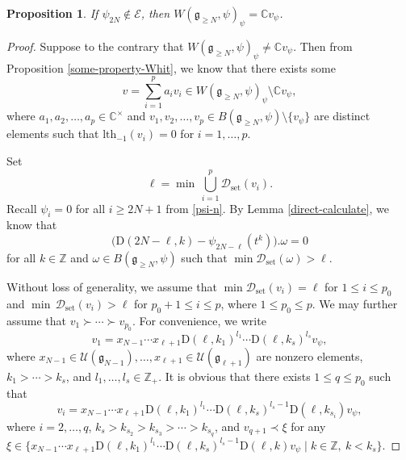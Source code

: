 \documentclass[12pt, a4paper]{amsart}
\newcommand{\fg}{\mathfrak g}
\newcommand{\C}{\mathbb{C}}
\newcommand{\Z}{\mathbb Z}
\newcommand{\rD}{\mathrm{D}}
\newcommand{\U}{\mathcal{U}}
\theoremstyle{Theorem}
\theoremstyle{Theorem}
\newtheorem{proposition}[thm]{Proposition}
\numberwithin{equation}{section}
\begin{document}
\begin{proposition}\label{EXP-2N}
If $\psi_{2N}\notin\mathcal{E}$, then $W(\fg_{\geq N},\psi)_{\psi}=\C v_{\psi}$.
\end{proposition}
\begin{proof}
Suppose to the contrary that $W(\fg_{\geq N},\psi)_{\psi}\neq\C v_{\psi}$.
Then from Proposition \ref{some-property-Whit}, we know that
there exists some \[v=\sum_{i=1}^{p}a_{i}v_{i}\in W(\fg_{\geq N},\psi)_{\psi}\setminus \C v_{\psi},\]
where $a_{1},a_{2},\dots,a_{p}\in\C^{\times}$ and
$v_{1},v_{2},\dots,v_{p}\in B(\fg_{\geq N},\psi)\setminus\{v_{\psi}\}$ are distinct elements
such that $\mathrm{lth}_{-1}(v_{i})=0$ for $i=1,\dots,p$.

Set \[\ell=\min\,\bigcup_{i=1}^{p}\mathcal{D}_{\mathrm{set}}(v_{i}).\]
Recall $\psi_{i}=0$ for all $i\geq2N+1$ from \eqref{psi-n}. By Lemma \ref{direct-calculate}, we know that
\[\big(\rD(2N-\ell,k)-\psi_{2N-\ell}(t^{k})\big).\omega=0\]
for all $k\in\Z$ and $\omega\in B(\fg_{\geq N},\psi)$ such that $\min\mathcal{D}_{\mathrm{set}}(\omega)>\ell$.

Without loss of generality, we assume that $\min\mathcal{D}_{\mathrm{set}}(v_{i})=\ell$
for $1\leq i\leq p_{0}$ and $\min\,\mathcal{D}_{\mathrm{set}}(v_{i})>\ell$ for $p_{0}+1\leq i\leq p$,
where $1\leq p_{0}\leq p$. We may further assume that $v_{1}\succ\cdots\succ v_{p_{0}}$.
For convenience, we write \[v_{1}=x_{N-1}\cdots x_{\ell+1}\rD(\ell,k_{1})^{l_{1}}\cdots\rD(\ell,k_{s})^{l_{s}}v_{\psi},\]
where $x_{N-1}\in\U(\fg_{N-1}),\dots,x_{\ell+1}\in\U(\fg_{\ell+1})$ are nonzero elements, $k_{1}>\cdots>k_{s}$,
and $l_{1},\dots,l_{s}\in\Z_{+}$. It is obvious that there exists $1\leq q\leq p_{0}$ such that
\[v_{i}=x_{N-1}\cdots x_{\ell+1}\rD(\ell,k_{1})^{l_{1}}\cdots\rD(\ell,k_{s})^{l_{s}-1}\rD(\ell,k_{s_{i}})v_{\psi},\]
where $i=2,\dots,q$, $k_{s}>k_{s_{2}}>k_{s_{3}}>\cdots>k_{s_{q}}$, and $v_{q+1}\prec \xi$
for any $\xi\in\{x_{N-1}\cdots x_{\ell+1}\rD(\ell,k_{1})^{l_{1}}\cdots
\rD(\ell,k_{s})^{l_{s}-1}\rD(\ell,k)v_{\psi}\mid k\in\Z,\ k<k_{s}\}$.
\vspace{3mm}


\end{proof}
\end{document}
